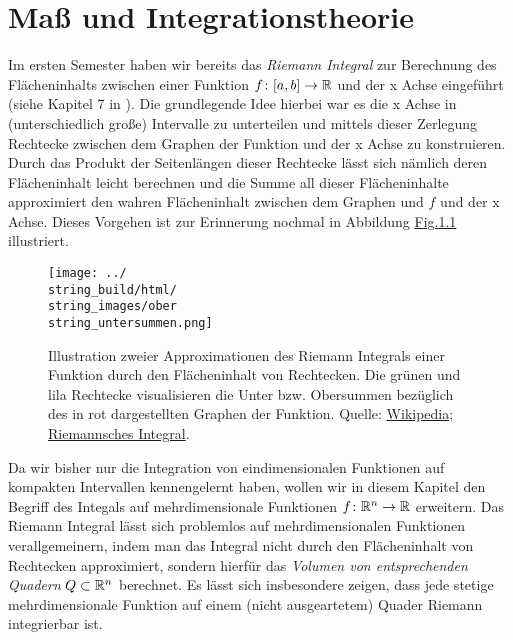 \chapter{Maß  und Integrationstheorie}
\label{\detokenize{masstheorie/intro_masstheorie:masz-und-integrationstheorie}}\label{\detokenize{masstheorie/intro_masstheorie::doc}}
\par
Im ersten Semester haben wir bereits das \emph{Riemann Integral} zur Berechnung des Flächeninhalts zwischen einer Funktion \(f \colon [a,b] \rightarrow \mathbb{R}\) und der x Achse eingeführt (siehe Kapitel 7 in \cite{Bur20}).
Die grundlegende Idee hierbei war es die x Achse in (unterschiedlich große) Intervalle zu unterteilen und mittels dieser Zerlegung Rechtecke zwischen dem Graphen der Funktion und der x Achse zu konstruieren.
Durch das Produkt der Seitenlängen dieser Rechtecke lässt sich nämlich deren Flächeninhalt leicht berechnen und die Summe all dieser Flächeninhalte approximiert den wahren Flächeninhalt zwischen dem Graphen und \(f\) und der x Achse.
Dieses Vorgehen ist zur Erinnerung nochmal in Abbildung \hyperref[\detokenize{masstheorie/intro_masstheorie:fig-riemann-integral}]{Fig.\@ \ref{\detokenize{masstheorie/intro_masstheorie:fig-riemann-integral}}} illustriert.

\begin{figure}[htbp]
\centering


\noindent\texttt{[image: ../\\string\_build/html/\\string\_images/ober\\string\_untersummen.png]}
\caption{Illustration zweier Approximationen des Riemann Integrals einer Funktion durch den Flächeninhalt von Rechtecken. Die grünen und lila Rechtecke visualisieren die Unter  bzw. Obersummen bezüglich des in rot dargestellten Graphen der Funktion. Quelle: \href{https://de.wikipedia.org/wiki/Riemannsches\_Integral}{Wikipedia; Riemannsches Integral}.}\label{\detokenize{masstheorie/intro_masstheorie:fig-riemann-integral}}\end{figure}

\par
Da wir bisher nur die Integration von eindimensionalen Funktionen auf kompakten Intervallen kennengelernt haben, wollen wir in diesem Kapitel den Begriff des Integals auf mehrdimensionale Funktionen \(f \colon \mathbb{R}^n \rightarrow \mathbb{R}\) erweitern.
Das Riemann Integral lässt sich problemlos auf mehrdimensionalen Funktionen verallgemeinern, indem man das Integral nicht durch den Flächeninhalt von Rechtecken approximiert, sondern hierfür das \emph{Volumen von entsprechenden Quadern} \(Q \subset \mathbb{R}^n\) berechnet.
Es lässt sich insbesondere zeigen, dass jede stetige mehrdimensionale Funktion auf einem (nicht ausgeartetem) Quader Riemann integrierbar ist.

